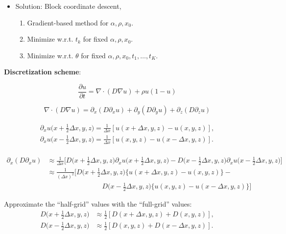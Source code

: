 \documentclass[12pt]{article}
\newcommand{\pp}{\partial}
\begin{document}
\begin{itemize}[noitemsep,topsep=0pt,leftmargin=*]
\item Solution: Block coordinate descent,
\begin{enumerate}[leftmargin=*,noitemsep,topsep=0pt]
    \item Gradient-based method for $\alpha, \rho, x_0$.
    \item Minimize w.r.t. $t_k$ for fixed $\alpha, \rho, x_0$.
    \item Minimize w.r.t. $\theta$ for fixed $\alpha, \rho, x_0, t_1, \ldots, t_K$.
\end{enumerate}
\end{itemize}

\noindent\textbf{Discretization scheme}:

\[ \frac{\pp u}{\pp t} = \nabla \cdot (D \nabla u) + \rho u (1 - u) \]

\[ \nabla \cdot (D \nabla u) = \pp_x (D \pp_x u) + \pp_y (D \pp_y u) + \pp_z (D \pp_z u) \]

\begin{align*}
\pp_x u\bigg(x + \frac{1}{2}\Delta x, y, z\bigg) = \frac{1}{\Delta x}[ u(x + \Delta x, y, z) - u(x, y, z) ], \\
\pp_x u\bigg(x - \frac{1}{2}\Delta x, y, z\bigg) = \frac{1}{\Delta x}[ u(x, y, z) - u(x - \Delta x, y, z) ]. \\
\end{align*}

\begin{align*}
\pp_x (D \pp_x u) & \approx \frac{1}{\Delta x} \bigg[ D\bigg(x+\frac{1}{2}\Delta x, y, z\bigg) \pp_x u\bigg(x + \frac{1}{2}\Delta x, y, z\bigg) - D\bigg(x-\frac{1}{2}\Delta x, y, z\bigg) \pp_x u\bigg(x - \frac{1}{2}\Delta x, y, z\bigg) \bigg] \\
& \approx \frac{1}{( \Delta x )^2} \bigg[ D\bigg(x+\frac{1}{2}\Delta x, y, z\bigg) \bigg\{ u(x + \Delta x, y, z) - u(x, y, z) \bigg\} -
\\ & \qquad\qquad\qquad\qquad D\bigg(x-\frac{1}{2}\Delta x, y, z\bigg) \bigg\{ u(x, y, z) - u(x - \Delta x, y, z) \bigg\} \bigg]
\end{align*}

Approximate the ``half-grid'' values with the ``full-grid'' values:
\begin{align*}
D\bigg(x+\frac{1}{2}\Delta x, y, z\bigg) & \approx \frac{1}{2} [D(x + \Delta x, y, z) + D(x, y, z)], \\
D\bigg(x-\frac{1}{2}\Delta x, y, z\bigg) & \approx \frac{1}{2} [D(x, y, z) + D(x - \Delta x, y, z)].
\end{align*}
\end{document}
